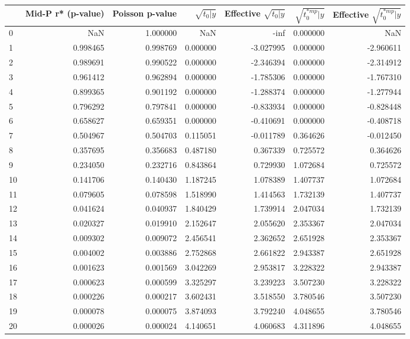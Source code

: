\begin{tabular}{lrrrrrr}
\toprule
 & Mid-P r* (p-value) & Poisson p-value & $\sqrt{t_0\vert y}$ & Effective $\sqrt{t_0\vert y}$ & $\sqrt{t_0^{*mp}\vert y}$ & Effective $\sqrt{t_0^{*mp}\vert y}$ \\
\midrule
0 & NaN & 1.000000 & NaN & -inf & 0.000000 & NaN \\
1 & 0.998465 & 0.998769 & 0.000000 & -3.027995 & 0.000000 & -2.960611 \\
2 & 0.989691 & 0.990522 & 0.000000 & -2.346394 & 0.000000 & -2.314912 \\
3 & 0.961412 & 0.962894 & 0.000000 & -1.785306 & 0.000000 & -1.767310 \\
4 & 0.899365 & 0.901192 & 0.000000 & -1.288374 & 0.000000 & -1.277944 \\
5 & 0.796292 & 0.797841 & 0.000000 & -0.833934 & 0.000000 & -0.828448 \\
6 & 0.658627 & 0.659351 & 0.000000 & -0.410691 & 0.000000 & -0.408718 \\
7 & 0.504967 & 0.504703 & 0.115051 & -0.011789 & 0.364626 & -0.012450 \\
8 & 0.357695 & 0.356683 & 0.487180 & 0.367339 & 0.725572 & 0.364626 \\
9 & 0.234050 & 0.232716 & 0.843864 & 0.729930 & 1.072684 & 0.725572 \\
10 & 0.141706 & 0.140430 & 1.187245 & 1.078389 & 1.407737 & 1.072684 \\
11 & 0.079605 & 0.078598 & 1.518990 & 1.414563 & 1.732139 & 1.407737 \\
12 & 0.041624 & 0.040937 & 1.840429 & 1.739914 & 2.047034 & 1.732139 \\
13 & 0.020327 & 0.019910 & 2.152647 & 2.055620 & 2.353367 & 2.047034 \\
14 & 0.009302 & 0.009072 & 2.456541 & 2.362652 & 2.651928 & 2.353367 \\
15 & 0.004002 & 0.003886 & 2.752868 & 2.661822 & 2.943387 & 2.651928 \\
16 & 0.001623 & 0.001569 & 3.042269 & 2.953817 & 3.228322 & 2.943387 \\
17 & 0.000623 & 0.000599 & 3.325297 & 3.239223 & 3.507230 & 3.228322 \\
18 & 0.000226 & 0.000217 & 3.602431 & 3.518550 & 3.780546 & 3.507230 \\
19 & 0.000078 & 0.000075 & 3.874093 & 3.792240 & 4.048655 & 3.780546 \\
20 & 0.000026 & 0.000024 & 4.140651 & 4.060683 & 4.311896 & 4.048655 \\
\bottomrule
\end{tabular}
